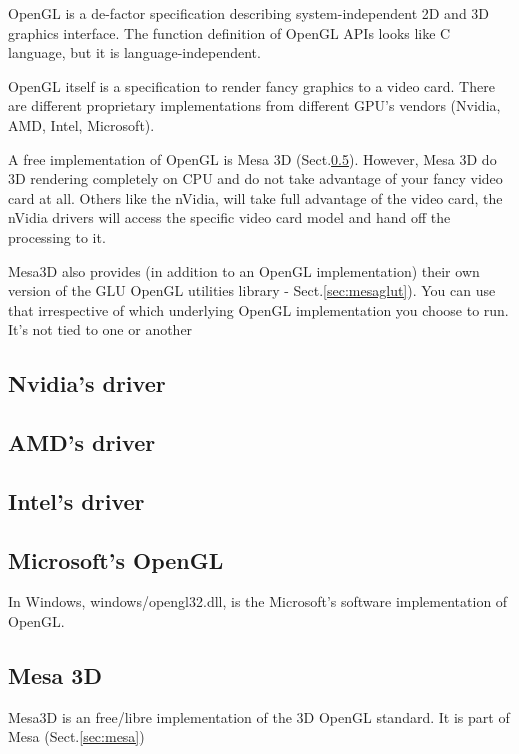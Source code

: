 OpenGL is a de-factor specification describing system-independent 2D and 3D
graphics interface. The function definition of OpenGL APIs looks like C
language, but it is language-independent.

OpenGL itself is a specification to render fancy graphics to a video card.
There are different proprietary implementations from different GPU's vendors
(Nvidia, AMD, Intel, Microsoft). 

A free implementation of OpenGL is Mesa 3D (Sect.\ref{sec:mesa-3d}). However,
Mesa 3D do 3D rendering completely on CPU and do not take advantage of
your fancy video card at all. Others like the nVidia, will take full advantage
of the video card, the nVidia drivers will access the specific video card model
and hand off the processing to it.

Mesa3D also provides (in addition to an OpenGL implementation) their own version
of the GLU OpenGL utilities library - Sect.\ref{sec:mesaglut}). You can use that
irrespective of which underlying OpenGL implementation you choose to run. It's
not tied to one or another


\subsection{Nvidia's driver}

\subsection{AMD's driver}

\subsection{Intel's driver}

\subsection{Microsoft's OpenGL}

In Windows, windows/opengl32.dll, is the 
Microsoft's software implementation of OpenGL.



\subsection{Mesa 3D}
\label{sec:mesa-3d}

Mesa3D is an free/libre implementation of the 3D OpenGL standard. It is part of
Mesa (Sect.\ref{sec:mesa})

